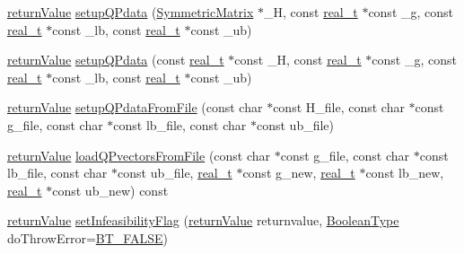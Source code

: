 \begin{DoxyCompactItemize}
\item 
\hyperlink{_message_handling_8hpp_a81d556f613bfbabd0b1f9488c0fa865e}{return\+Value} \hyperlink{class_q_problem_b_ab785215eb0f10994203a19632b715212}{setup\+Q\+Pdata} (\hyperlink{class_symmetric_matrix}{Symmetric\+Matrix} $\ast$\+\_\+H, const \hyperlink{qp_o_a_s_e_s__wrapper_8h_a0d00e2b3dfadee81331bbb39068570c4}{real\+\_\+t} $\ast$const \+\_\+g, const \hyperlink{qp_o_a_s_e_s__wrapper_8h_a0d00e2b3dfadee81331bbb39068570c4}{real\+\_\+t} $\ast$const \+\_\+lb, const \hyperlink{qp_o_a_s_e_s__wrapper_8h_a0d00e2b3dfadee81331bbb39068570c4}{real\+\_\+t} $\ast$const \+\_\+ub)
\item 
\hyperlink{_message_handling_8hpp_a81d556f613bfbabd0b1f9488c0fa865e}{return\+Value} \hyperlink{class_q_problem_b_a8c54c1a5fdbf94bba199e50a63ae06ce}{setup\+Q\+Pdata} (const \hyperlink{qp_o_a_s_e_s__wrapper_8h_a0d00e2b3dfadee81331bbb39068570c4}{real\+\_\+t} $\ast$const \+\_\+H, const \hyperlink{qp_o_a_s_e_s__wrapper_8h_a0d00e2b3dfadee81331bbb39068570c4}{real\+\_\+t} $\ast$const \+\_\+g, const \hyperlink{qp_o_a_s_e_s__wrapper_8h_a0d00e2b3dfadee81331bbb39068570c4}{real\+\_\+t} $\ast$const \+\_\+lb, const \hyperlink{qp_o_a_s_e_s__wrapper_8h_a0d00e2b3dfadee81331bbb39068570c4}{real\+\_\+t} $\ast$const \+\_\+ub)
\item 
\hyperlink{_message_handling_8hpp_a81d556f613bfbabd0b1f9488c0fa865e}{return\+Value} \hyperlink{class_q_problem_b_a6ea1dcb60fb520c18f1612b944875160}{setup\+Q\+Pdata\+From\+File} (const char $\ast$const H\+\_\+file, const char $\ast$const g\+\_\+file, const char $\ast$const lb\+\_\+file, const char $\ast$const ub\+\_\+file)
\item 
\hyperlink{_message_handling_8hpp_a81d556f613bfbabd0b1f9488c0fa865e}{return\+Value} \hyperlink{class_q_problem_b_a50f4ae650239798b58979714bb35e51a}{load\+Q\+Pvectors\+From\+File} (const char $\ast$const g\+\_\+file, const char $\ast$const lb\+\_\+file, const char $\ast$const ub\+\_\+file, \hyperlink{qp_o_a_s_e_s__wrapper_8h_a0d00e2b3dfadee81331bbb39068570c4}{real\+\_\+t} $\ast$const g\+\_\+new, \hyperlink{qp_o_a_s_e_s__wrapper_8h_a0d00e2b3dfadee81331bbb39068570c4}{real\+\_\+t} $\ast$const lb\+\_\+new, \hyperlink{qp_o_a_s_e_s__wrapper_8h_a0d00e2b3dfadee81331bbb39068570c4}{real\+\_\+t} $\ast$const ub\+\_\+new) const
\item 
\hyperlink{_message_handling_8hpp_a81d556f613bfbabd0b1f9488c0fa865e}{return\+Value} \hyperlink{class_q_problem_b_a07d0ca4a5fcac26c857f41154e4ff6e3}{set\+Infeasibility\+Flag} (\hyperlink{_message_handling_8hpp_a81d556f613bfbabd0b1f9488c0fa865e}{return\+Value} returnvalue, \hyperlink{_types_8hpp_a20f82124c82b6f5686a7fce454ef9089}{Boolean\+Type} do\+Throw\+Error=\hyperlink{_types_8hpp_a20f82124c82b6f5686a7fce454ef9089a85b8a20e72a8bea5dd10a6007fe3071e}{B\+T\+\_\+\+F\+A\+L\+SE})

\end{DoxyCompactItemize}
